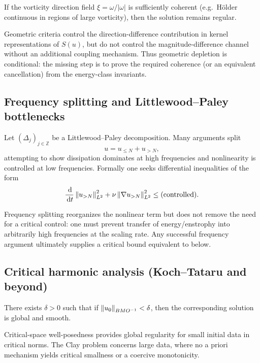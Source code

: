 \begin{theorem}
If the vorticity direction field $\xi=\omega/|\omega|$ is sufficiently coherent (e.g.\ H\"older continuous in regions of large vorticity),
then the solution remains regular.
\end{theorem}

\begin{proposition}\label{prop:geo-wall}
Geometric criteria control the direction-difference contribution in kernel representations of $S(u)$,
but do not control the magnitude-difference channel without an additional coupling mechanism.
Thus geometric depletion is conditional: the missing step is to prove the required coherence (or an equivalent cancellation)
from the energy-class invariants.
\end{proposition}

\subsection{Frequency splitting and Littlewood--Paley bottlenecks}
Let $(\Delta_j)_{j\in\mathbb Z}$ be a Littlewood--Paley decomposition. Many arguments split
\[
u = u_{\le N}+u_{>N},
\]
attempting to show dissipation dominates at high frequencies and nonlinearity is controlled at low frequencies.
Formally one seeks differential inequalities of the form
\[
\frac{\,\mathrm{d}}{\,\mathrm{d} t}\left\lVert u_{>N}\right\rVert_{L^2}^2 + \nu \left\lVert \nabla u_{>N}\right\rVert_{L^2}^2 \le \text{(controlled)}.
\]

\begin{proposition}\label{prop:freq-wall}
Frequency splitting reorganizes the nonlinear term but does not remove the need for a critical control:
one must prevent transfer of energy/enstrophy into arbitrarily high frequencies at the scaling rate.
Any successful frequency argument ultimately supplies a critical bound equivalent to
 below.
\end{proposition}

\subsection{Critical harmonic analysis (Koch--Tataru and beyond)}
\begin{theorem}
There exists $\delta>0$ such that if $\left\lVert u_0\right\rVert_{BMO^{-1}}<\delta$, then the corresponding solution is global and smooth.
\end{theorem}

\begin{proposition}\label{prop:large-data-wall}
Critical-space well-posedness provides global regularity for small initial data in critical norms.
The Clay problem concerns large data, where no a priori mechanism yields critical smallness or a coercive monotonicity.
\end{proposition}


\clearpage
